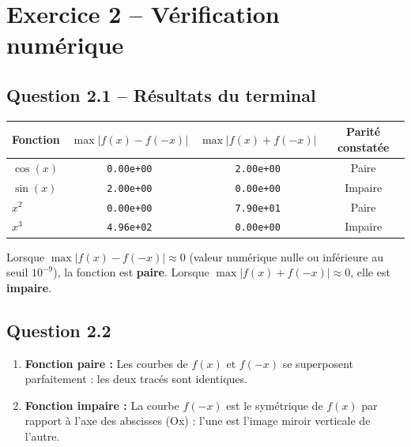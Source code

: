 \documentclass[12pt,a4paper]{article}
\begin{document}
\section*{Exercice 2 -- Vérification numérique}

\subsection*{Question 2.1 -- Résultats du terminal}

\renewcommand{\arraystretch}{2}
\begin{center}
\begin{tabular}{|l|c|c|c|}
    \hline
    \textbf{Fonction} & $\max|f(x)-f(-x)|$ & $\max|f(x)+f(-x)|$ & \textbf{Parité constatée} \\
    \hline
    $\cos(x)$ & \texttt{0.00e+00} & \texttt{2.00e+00} & Paire \\
    \hline
    $\sin(x)$ & \texttt{2.00e+00} & \texttt{0.00e+00} & Impaire \\
    \hline
    $x^2$ & \texttt{0.00e+00} & \texttt{7.90e+01} & Paire \\
    \hline
    $x^3$ & \texttt{4.96e+02} & \texttt{0.00e+00} & Impaire \\
    \hline
\end{tabular}
\end{center}

\begin{repbox}
Lorsque $\max|f(x)-f(-x)| \approx 0$ (valeur numérique nulle ou inférieure au seuil $10^{-9}$), la fonction est \textbf{paire}. Lorsque $\max|f(x)+f(-x)| \approx 0$, elle est \textbf{impaire}.
\end{repbox}

\subsection*{Question 2.2}

\begin{repbox}
\begin{enumerate}[label=\alph*)]
    \item \textbf{Fonction paire :} Les courbes de $f(x)$ et $f(-x)$ se superposent parfaitement : les deux tracés sont identiques.
    \item \textbf{Fonction impaire :} La courbe $f(-x)$ est le symétrique de $f(x)$ par rapport à l'axe des abscisses (Ox) : l'une est l'image miroir verticale de l'autre.
\end{enumerate}
\end{repbox}
\end{document}
